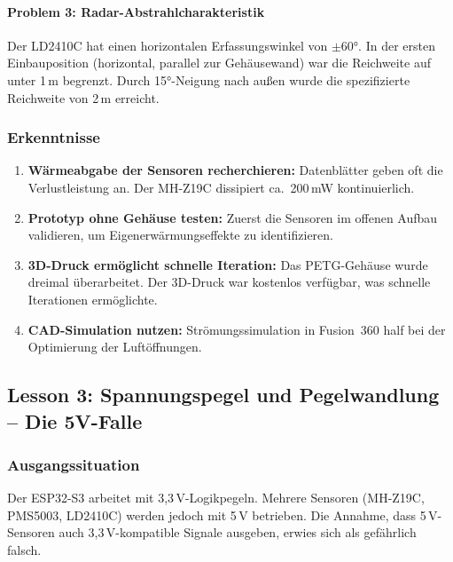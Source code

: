 \paragraph{Problem 3: Radar-Abstrahlcharakteristik}
Der LD2410C hat einen horizontalen Erfassungswinkel von $\pm$60°. In der ersten Einbauposition (horizontal, parallel zur Gehäusewand) war die Reichweite auf unter 1\,m begrenzt. Durch 15°-Neigung nach außen wurde die spezifizierte Reichweite von 2\,m erreicht.

\subsubsection{Erkenntnisse}

\begin{enumerate}[nosep]
\item \textbf{Wärmeabgabe der Sensoren recherchieren:} Datenblätter geben oft die Verlustleistung an. Der MH-Z19C dissipiert ca.\ 200\,mW kontinuierlich.
\item \textbf{Prototyp ohne Gehäuse testen:} Zuerst die Sensoren im offenen Aufbau validieren, um Eigenerwärmungseffekte zu identifizieren.
\item \textbf{3D-Druck ermöglicht schnelle Iteration:} Das PETG-Gehäuse wurde dreimal überarbeitet. Der 3D-Druck war kostenlos verfügbar, was schnelle Iterationen ermöglichte.
\item \textbf{CAD-Simulation nutzen:} Strömungssimulation in Fusion~360 half bei der Optimierung der Luftöffnungen.
\end{enumerate}

\subsection{Lesson 3: Spannungspegel und Pegelwandlung -- Die 5V-Falle}
\label{sec:lesson_levelshift}

\subsubsection{Ausgangssituation}

Der ESP32-S3 arbeitet mit 3,3\,V-Logikpegeln. Mehrere Sensoren (MH-Z19C, PMS5003, LD2410C) werden jedoch mit 5\,V betrieben. Die Annahme, dass 5\,V-Sensoren auch 3,3\,V-kompatible Signale ausgeben, erwies sich als gefährlich falsch.


